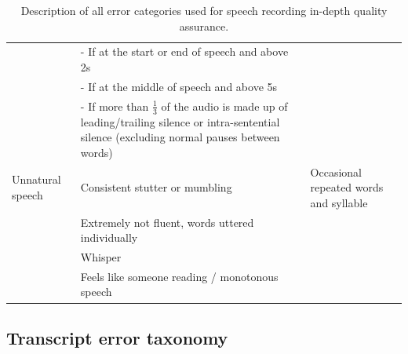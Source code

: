 \begin{table}[!ht]
\begin{tabular}{p{3cm}p{6cm}p{6cm}}
 & \small{- If at the start or end of speech and above 2s} & \\
 & \small{- If at the middle of speech and above 5s} & \\
 & \small{- If more than $\frac{1}{3}$ of the audio is made up of leading/trailing silence or intra-sentential silence (excluding normal pauses between words)} & \\
\midrule
\small{Unnatural speech} & \small{Consistent stutter or mumbling} & \small{Occasional repeated words and syllable} \\
 & \small{Extremely not fluent, words uttered individually} & \\
 & \small{Whisper} & \\
 & \small{Feels like someone reading / monotonous speech} & \\
     \bottomrule
    \end{tabular}
    \caption{Description of all error categories used for speech recording in-depth quality assurance.}
    \label{tab:speech_qa_errors}
\end{table}


\subsection{Transcript error taxonomy}


